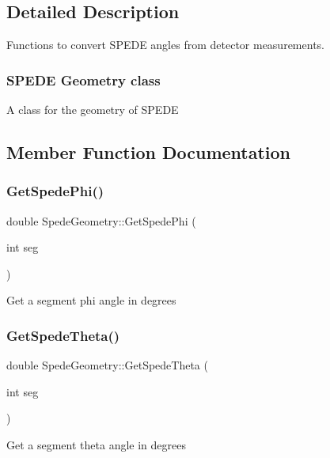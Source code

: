 \subsection{Detailed Description}
Functions to convert S\+P\+E\+DE angles from detector measurements. 



 \subsubsection*{S\+P\+E\+DE Geometry class }

A class for the geometry of S\+P\+E\+DE 

\subsection{Member Function Documentation}
\mbox{\label{class_spede_geometry_a93bd92636bce1259b189bb17275d238d}} 
\subsubsection{\texorpdfstring{Get\+Spede\+Phi()}{GetSpedePhi()}}
{\footnotesize\ttfamily double Spede\+Geometry\+::\+Get\+Spede\+Phi (\begin{DoxyParamCaption}\item[{int}]{seg }\end{DoxyParamCaption})}

Get a segment phi angle in degrees \mbox{\label{class_spede_geometry_a05865b0752fb518337a9a16f8fba9085}} 
\subsubsection{\texorpdfstring{Get\+Spede\+Theta()}{GetSpedeTheta()}}
{\footnotesize\ttfamily double Spede\+Geometry\+::\+Get\+Spede\+Theta (\begin{DoxyParamCaption}\item[{int}]{seg }\end{DoxyParamCaption})}

Get a segment theta angle in degrees \mbox{\label{class_spede_geometry_a94c3f5b2dbf4490db7d72514c8abe340}} 
